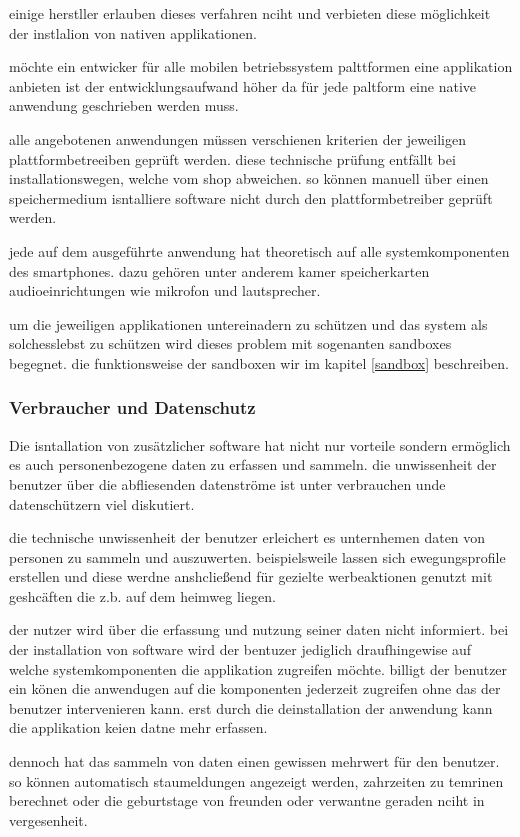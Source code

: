 einige herstller erlauben dieses verfahren nciht und verbieten diese möglichkeit der instlalion von nativen applikationen.

möchte ein entwicker für alle mobilen betriebssystem palttformen eine applikation anbieten ist der entwicklungsaufwand höher da für jede paltform eine native anwendung geschrieben werden muss.

alle angebotenen anwendungen müssen verschienen kriterien der jeweiligen plattformbetreeiben geprüft werden. diese technische prüfung entfällt bei installationswegen, welche vom shop abweichen. so können manuell über einen speichermedium isntalliere software nicht durch den plattformbetreiber geprüft werden.

jede auf dem ausgeführte anwendung hat theoretisch auf alle systemkomponenten des smartphones. dazu gehören unter anderem kamer speicherkarten audioeinrichtungen wie mikrofon und lautsprecher.

um die jeweiligen applikationen untereinadern zu schützen und das system als solchesslebst zu schützen wird dieses problem mit sogenanten sandboxes begegnet. die funktionsweise der sandboxen wir im kapitel \ref{sandbox} beschreiben.
\subsubsection{Verbraucher und Datenschutz}
Die isntallation von zusätzlicher software hat nicht nur vorteile sondern ermöglich es auch personenbezogene daten zu erfassen und sammeln. die unwissenheit der benutzer über die abfliesenden datenströme ist unter verbrauchen unde datenschützern viel diskutiert.

die technische unwissenheit der benutzer erleichert es  unternhemen daten von personen zu sammeln und auszuwerten. beispielsweile lassen sich ewegungsprofile erstellen und diese werdne anshcließend für gezielte werbeaktionen genutzt mit geshcäften die z.b. auf dem heimweg liegen.

der nutzer wird über die erfassung und nutzung seiner daten nicht informiert. bei der installation von software wird der bentuzer jediglich draufhingewise auf welche systemkomponenten die applikation zugreifen möchte. billigt der benutzer ein könen die anwendugen auf die komponenten jederzeit zugreifen ohne das der benutzer intervenieren kann. erst durch die deinstallation der anwendung kann die applikation keien datne mehr erfassen.

dennoch hat das sammeln von daten einen gewissen mehrwert für den benutzer. so können automatisch staumeldungen angezeigt werden, zahrzeiten zu temrinen berechnet oder die geburtstage von freunden oder verwantne geraden nciht in vergesenheit.

